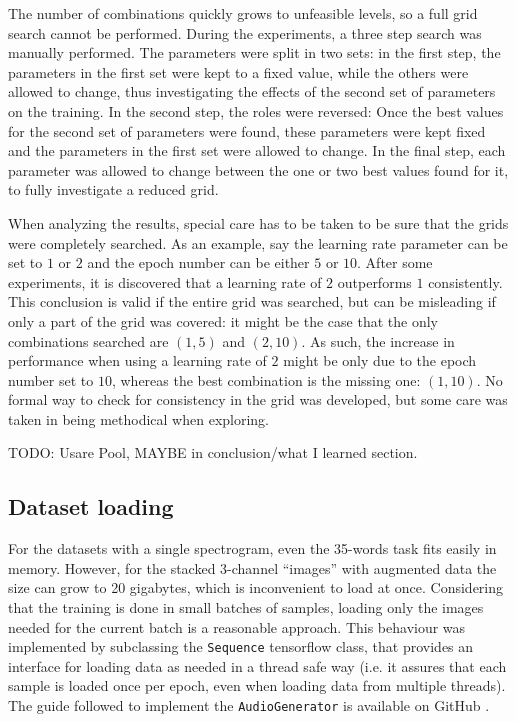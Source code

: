 The number of combinations quickly grows to unfeasible levels, so a full grid
search cannot be performed.
During the experiments, a three step search was manually performed.
The parameters were split in two sets:
in the first step, the parameters in the first set were kept to a fixed value,
while the others were allowed to change, thus investigating the effects of the
second set of parameters on the training.
In the second step, the roles were reversed:
Once the best values for the second set of parameters were found, these
parameters were kept fixed and the parameters in the first set were allowed to
change.
In the final step, each parameter was allowed to change between the one or two
best values found for it, to fully investigate a reduced grid.

When analyzing the results, special care has to be taken to be sure that
the grids were completely searched.
As an example, say the learning rate parameter can be set to $1$ or $2$
and the epoch number can be either $5$ or $10$.
After some experiments, it is discovered that a learning rate of $2$
outperforms $1$ consistently.
This conclusion is valid if the entire grid was searched, but can be misleading
if only a part of the grid was covered: it might be the case that the only
combinations searched are $(1, 5)$ and $(2, 10)$.
As such, the increase in performance when using a learning rate of $2$ might be
only due to the epoch number set to $10$, whereas the best combination is the
missing one: $(1, 10)$.
No formal way to check for consistency in the grid was developed,
but some care was taken in being methodical when exploring.


TODO: Usare Pool, MAYBE in conclusion/what I learned section.


\subsection{Dataset loading}


For the datasets with a single spectrogram, even the 35-words task fits easily
in memory. However, for the stacked 3-channel ``images'' with augmented data
the size can grow to 20 gigabytes, which is inconvenient to load at once.
Considering that the training is done in small batches of samples, loading only
the images needed for the current batch is a reasonable approach.
This behaviour was implemented by subclassing the \texttt{Sequence} tensorflow
class, that provides an interface for loading data as needed in a thread safe
way (i.e. it assures that each sample is loaded once per epoch, even when
loading data from multiple threads).
The guide followed to implement the \texttt{AudioGenerator} is available on 
GitHub \cite{afshineaKDG}.

